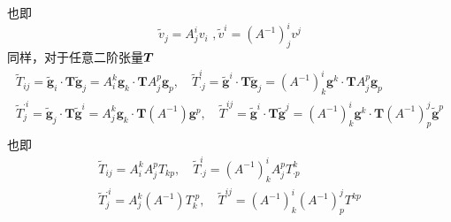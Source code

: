 也即
\begin{equation}\label{equ:2.35}
    \tilde{v}_j=A_{j}^{i}v_i\,\, ,  \tilde{v}^i=\left( A^{-1} \right) _{j}^{i}v^j
\end{equation}
同样，对于任意二阶张量$\boldsymbol{T}$
\begin{equation}\label{equ:2.36}
    \begin{array}{c}
        \widetilde{T}_{ij}=\tilde{\boldsymbol{g}}_i\cdot \boldsymbol{T}\tilde{\boldsymbol{g}}_j=A_{i}^{k}\boldsymbol{g}_k\cdot \boldsymbol{T}A_{j}^{p}\boldsymbol{g}_p,\quad \widetilde{T}_{\cdot j}^{i}=\tilde{\boldsymbol{g}}^i\cdot \boldsymbol{T}\tilde{\boldsymbol{g}}_j=\left( A^{-1} \right) _{k}^{i}\boldsymbol{g}^k\cdot \boldsymbol{T}A_{j}^{p}\boldsymbol{g}_p\\
        \widetilde{T}_{j}^{\cdot i}=\tilde{\boldsymbol{g}}_j\cdot \boldsymbol{T}\tilde{\boldsymbol{g}}^i=A_{j}^{k}\boldsymbol{g}_k\cdot \boldsymbol{T}\left( A^{-1} \right) \boldsymbol{g}^p,\quad \widetilde{T}^{ij}=\tilde{\boldsymbol{g}}^i\cdot \boldsymbol{T}\tilde{\boldsymbol{g}}^j=\left( A^{-1} \right) _{k}^{i}\boldsymbol{g}^k\cdot \boldsymbol{T}\left( A^{-1} \right) _{p}^{j}\tilde{\boldsymbol{g}}^p\\
    \end{array}
\end{equation}
也即
\begin{equation}\label{equ:2.37}
    \begin{array}{c}
        \widetilde{T}_{ij}=A_{i}^{k}A_{j}^{p}T_{kp},\quad \widetilde{T}_{\cdot j}^{i}=\left( A^{-1} \right) _{k}^{i}A_{j}^{p}T_{\cdot p}^{k}\\
        \widetilde{T}_{j}^{\cdot i}=A_{j}^{k}\left( A^{-1} \right) T_{k}^{\cdot p},\quad \widetilde{T}^{ij}=\left( A^{-1} \right) _{k}^{i}\left( A^{-1} \right) _{p}^{j}T^{kp}\\
    \end{array}
\end{equation}

